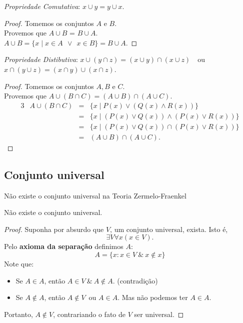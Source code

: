 \textit{Propriedade Comutativa}: $x \cup y = y \cup x$.
\begin{proof}
  Tomemos os conjuntos $A$ e $B.$\\
  Provemos que $A \cup B$ = $B \cup A.$\\
  $A \cup B = \{x \mid x \in A\ \ \lor\ \ x \in B \} = B \cup A.$
\end{proof}

\textit{Propriedade Distibutiva}: $x \cup (y \cap z) = (x \cup y) \cap (x \cup z)$\ \ ou\ \ $x \cap (y \cup z) = (x \cap y) \cup (x \cap z)$.
\begin{proof}
  Tomemos os conjuntos $A, B$ e $C.$\\
  Provemos que $A \cup (B \cap C) = (A \cup B) \cap (A \cup C).$
    \begin{alignat*}{3}
    & A \cup (B \cap C) &=& \{x \mid P(x) \lor (Q(x) \land R(x))\}\\
    & &=& \{x \mid (P(x) \lor Q(x)) \land (P(x) \lor R(x))\}\\
    & &=& \{x \mid (P(x) \lor Q(x)) \cap (P(x) \lor R(x))\}\\
    & &=& (A \cup B) \cap (A \cup C).
    \end{alignat*}
\end{proof}

\subsection{Conjunto universal}
\begin{stat}
  Não existe o conjunto universal na Teoria Zermelo-Fraenkel
\end{stat}
\begin{theorem}
  Não existe o conjunto universal.
\end{theorem}
\begin{proof}
  Suponha por absurdo que $V$, um conjunto universal, exista. Isto é, $$\exists V \forall x (x \in V).$$
  Pelo \textbf{axioma da separação} definimos $A$: $$A = \{x:x \in V\ \&\ x \notin x\}$$
  Note que:
    \begin{itemize}
      \item  Se $A \in A$, então $A \in V\ \&\ A \notin A.$ \quad (contradição)
      \item  Se $A \notin A$, então $A \notin V$\ ou $A \in A.$ Mas não podemos ter $A \in A.$
    \end{itemize}
Portanto, $A \notin V$, contrariando o fato de $V$ ser universal.
\end{proof}